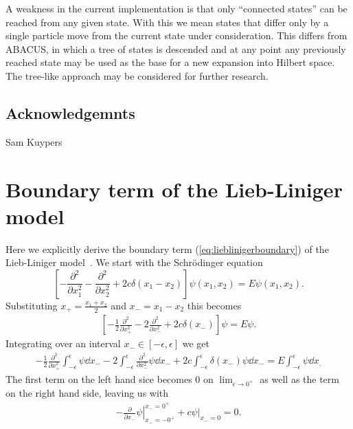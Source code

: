 \documentclass[11pt, a4paper]{report} %
\begin{document}
A weakness in the current implementation is that only ``connected states'' can be reached from any given state.
With this we mean states that differ only by a single particle move from the current state under consideration.
This differs from ABACUS, in which a tree of states is descended and at any point any previously reached state may be used as the base for a new expansion into Hilbert space.
The tree-like approach may be considered for further research.

\section*{Acknowledgemnts}
Sam Kuypers

\appendix

\chapter{Boundary term of the Lieb-Liniger model}\label{cha:boundary}

Here we explicitly derive the boundary term (\cref{eq:lieblinigerboundary}) of the Lieb-Liniger model~\cite{Caux2015}.
We start with the Schrödinger equation
\begin{equation}
	\left[- \frac{\partial^2}{\partial x_1^2} - \frac{\partial^2}{\partial x_2^2} + 2c \delta(x_1 - x_2)\right] \psi(x_1, x_2) = E \psi(x_1,x_2).
\end{equation} 
Substituting \(x_+ = \frac{x_1+x_2}{2}\) and \(x_-=x_1-x_2\) this becomes
\begin{align}
  \label{eq:17}
  	\left[-\frac{1}{2}\frac{\partial^2}{\partial x_+^2} - 2\frac{\partial^2}{\partial x_-^2} + 2c \delta(x_-)\right] \psi = E\psi.
\end{align}
Integrating over an interval \(x_-\in[-\epsilon,\epsilon]\) we get
\begin{align}
  \label{eq:18}
  -\frac{1}{2} \frac{\partial^2}{\partial x_+^2} \int_{-\epsilon}^{\epsilon} \psi \dd x_- - 2 \int_{-\epsilon}^{\epsilon} \frac{\partial^2}{\partial x_-^2}\psi \dd x_- + 2c\int_{-\epsilon}^{\epsilon} \delta(x_-)\psi \dd x_- = E\int_{-\epsilon}^{\epsilon} \psi \dd x_.
\end{align}
The first term on the left hand sice becomes 0 on \(\lim_{\epsilon\to0^+}\) as well as the term on the right hand side, leaving us with
\begin{align}
  \label{eq:19}
  \left.- \frac{\partial}{\partial x_-} \psi \right|_{x_-=-0^+}^{x_-=0^+}  + \left.c\psi\right|_{x_-=0} = 0.
\end{align}
\end{document}
